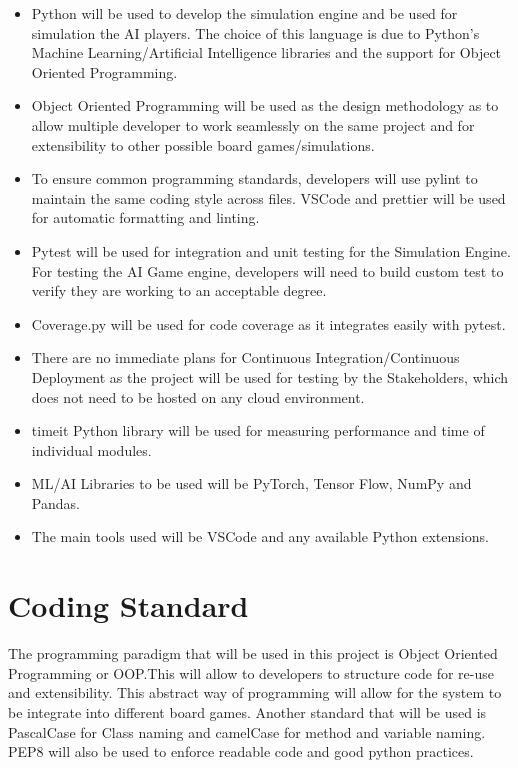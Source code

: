 \documentclass{article}
\begin{document}
\begin{itemize}
\item Python will be used to develop the simulation engine and be used for simulation the AI players. 
The choice of this language is due to Python's Machine Learning/Artificial Intelligence libraries and the support for
 Object Oriented Programming.
\item Object Oriented Programming will be used as the design methodology as to allow multiple developer to work seamlessly 
on the same project and for extensibility to other possible board games/simulations. 
\item To ensure common programming standards, developers will use pylint to maintain the same coding style across files. 
VSCode and prettier will be used for automatic formatting and linting.
\item Pytest will be used for integration and unit testing for the Simulation Engine. For testing the AI Game engine, developers will need to build custom test to verify they are working to an acceptable degree.
\item Coverage.py will be used for code coverage as it integrates easily with pytest.
\item There are no immediate plans for Continuous Integration/Continuous Deployment as the project will be used for testing by the 
Stakeholders, which does not need to be hosted on any cloud environment.
\item timeit Python library will be used for measuring performance and time of individual modules.
\item ML/AI Libraries to be used will be PyTorch, Tensor Flow, NumPy and Pandas.
\item The main tools used will be VSCode and any available Python extensions.
\end{itemize}

\section{Coding Standard}
The programming paradigm that will be used in this project is Object Oriented Programming or OOP.This will allow to developers to structure code
for re-use and extensibility. This abstract way of programming will allow for the system to be integrate into different board games. Another standard that
will be used is PascalCase for Class naming and camelCase for method and variable naming. PEP8 will also be used to enforce readable code and good python practices.
\end{document}
